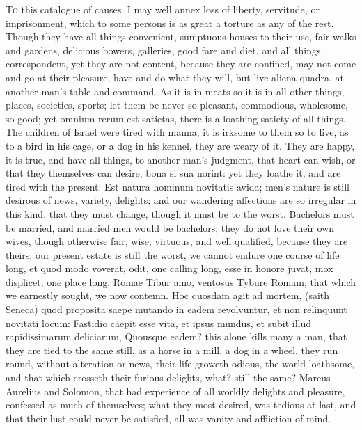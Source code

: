 {\lettrine{T}{o} this catalogue of causes, I may well annex loss of liberty,
servitude, or imprisonment, which to some persons is as great a torture
as any of the rest. Though they have all things convenient, sumptuous
houses to their use, fair walks and gardens, delicious bowers,
galleries, good fare and diet, and all things correspondent, yet they
are not content, because they are confined, may not come and go at
their pleasure, have and do what they will, but live aliena
quadra, at another man's table and command. As it is in meats so
it is in all other things, places, societies, sports; let them be never
so pleasant, commodious, wholesome, so good; yet omnium rerum est
satietas, there is a loathing satiety of all things. The children of
Israel were tired with manna, it is irksome to them so to live, as to a
bird in his cage, or a dog in his kennel, they are weary of it. They
are happy, it is true, and have all things, to another man's judgment,
that heart can wish, or that they themselves can desire, bona si sua
norint: yet they loathe it, and are tired with the present: Est natura
hominum novitatis avida; men's nature is still desirous of news,
variety, delights; and our wandering affections are so irregular in
this kind, that they must change, though it must be to the worst.
Bachelors must be married, and married men would be bachelors; they do
not love their own wives, though otherwise fair, wise, virtuous, and
well qualified, because they are theirs; our present estate is still
the worst, we cannot endure one course of life long, et quod modo
voverat, odit, one calling long, esse in honore juvat, mox displicet;
one place long, Romae Tibur amo, ventosus Tybure Romam, that
which we earnestly sought, we now contemn. Hoc quosdam agit ad mortem,
(saith Seneca) quod proposita saepe mutando in eadem revolvuntur,
et non relinquunt novitati locum: Fastidio caepit esse vita, et ipsus
mundus, et subit illud rapidissimarum deliciarum, Quousque eadem? this
alone kills many a man, that they are tied to the same still, as a
horse in a mill, a dog in a wheel, they run round, without alteration
or news, their life groweth odious, the world loathsome, and that which
crosseth their furious delights, what? still the same? Marcus Aurelius
and Solomon, that had experience of all worldly delights and pleasure,
confessed as much of themselves; what they most desired, was tedious at
last, and that their lust could never be satisfied, all was vanity and
affliction of mind.

}
